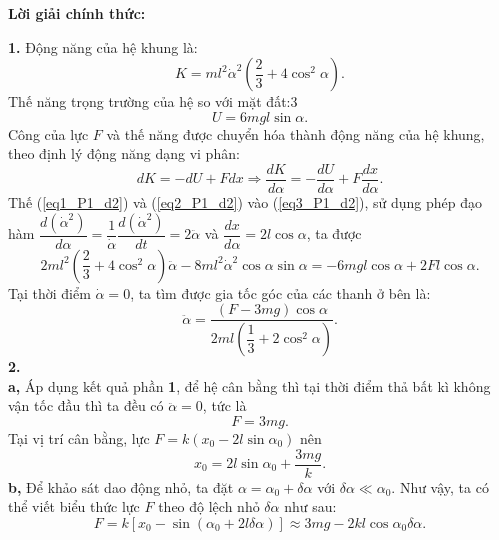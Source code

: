\noindent \textbf{Lời giải chính thức:}

\noindent \textbf{1.}
Động năng của hệ khung là:
\begin{equation} \label{eq1_P1_d2}
    K = m l^2 \dot{\alpha}^2 \left( \dfrac{2}{3} + 4 \cos^2 \alpha \right).
\end{equation}
Thế năng trọng trường của hệ so với mặt đất:3
\begin{equation} \label{eq2_P1_d2}
    U = 6 mgl \sin \alpha.
\end{equation}
Công của lực $F$ và thế năng được chuyển hóa thành động năng của hệ khung, theo định lý động năng dạng vi phân:
\begin{equation} \label{eq3_P1_d2}
    dK = -dU + Fdx \Rightarrow \dfrac{dK}{d \alpha} = - \dfrac{dU}{d \alpha} + F \dfrac{dx}{d \alpha}.
\end{equation}
Thế (\ref{eq1_P1_d2}) và (\ref{eq2_P1_d2}) vào (\ref{eq3_P1_d2}), sử dụng phép đạo hàm $ \dfrac{d (\dot{\alpha}^2)}{d \alpha} =\dfrac{1}{\dot{\alpha}} \dfrac{d (\dot{\alpha}^2)}{dt} = 2 \ddot{\alpha} $ và $\dfrac{dx}{d \alpha}= 2 l \cos \alpha$, ta được
\begin{equation} \label{eq4_P1_d2}
    2 ml^2 \left( \dfrac{2}{3} + 4 \cos^2 \alpha \right) \ddot{\alpha} - 8 m l^2 \dot{\alpha}^2 \cos \alpha \sin \alpha  = -6mgl \cos \alpha + 2 F l \cos \alpha.
\end{equation}
Tại thời điểm $\dot{\alpha}=0$, ta tìm được gia tốc góc của các thanh ở bên là:
\begin{equation} \label{eq5_P1_d2}
    \ddot{\alpha} = \dfrac{(F-3mg) \cos \alpha}{2 ml \left( \dfrac{1}{3} + 2 \cos^2 \alpha \right) }.
\end{equation}
\noindent \textbf{2.} \\
\noindent \textbf{a,} Áp dụng kết quả phần \textbf{1}, để hệ cân bằng thì tại thời điểm thả bất kì không vận tốc đầu thì ta đều có $\ddot{\alpha}=0$, tức là
\begin{equation} \label{eq6_P1_d2}
    F=3mg.
\end{equation}
Tại vị trí cân bằng, lực $F=k(x_0 - 2l \sin \alpha_0)$ nên 
\begin{equation} \label{eq7_P1_d2}
    x_0 = 2l \sin \alpha_0 + \dfrac{3mg}{k}.
\end{equation} 
\noindent \textbf{b,} Để khảo sát dao động nhỏ, ta đặt $\alpha= \alpha_0 + \delta \alpha$ với $\delta \alpha \ll \alpha_0$. Như vậy, ta có thể viết biểu thức lực $F$ theo độ lệch nhỏ $\delta \alpha$ như sau:
\begin{equation} \label{eq8_P1_d2}
    F = k [ x_0 - \sin (\alpha_0 + 2l \delta \alpha)] \approx 3mg - 2kl \cos \alpha_0 \delta \alpha.
\end{equation}
